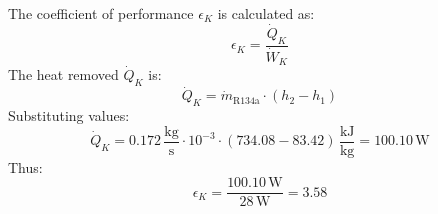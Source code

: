 The coefficient of performance \( \epsilon_K \) is calculated as:  
\[
\epsilon_K = \frac{\dot{Q}_K}{\dot{W}_K}
\]  
The heat removed \( \dot{Q}_K \) is:  
\[
\dot{Q}_K = \dot{m}_{\text{R134a}} \cdot (h_2 - h_1)
\]  
Substituting values:  
\[
\dot{Q}_K = 0.172 \, \frac{\text{kg}}{\text{s}} \cdot 10^{-3} \cdot (734.08 - 83.42) \, \frac{\text{kJ}}{\text{kg}} = 100.10 \, \text{W}
\]  
Thus:  
\[
\epsilon_K = \frac{100.10 \, \text{W}}{28 \, \text{W}} = 3.58
\]